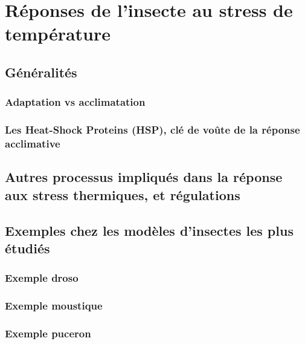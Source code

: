 \chapter{Réponses de l'insecte au stress de température} %
\label{chap:repstress}
	
	\section{Généralités} %
	\label{sec:g_n_ralit_s}
		

		\subsection{Adaptation vs acclimatation} %
		\label{sub:adaptation_vs_accilmatation}
			

%			

		\subsection{Les Heat-Shock Proteins (HSP), clé de voûte de la réponse acclimative} %
		\label{sub:generalites_HSP}
			

	\section{Autres processus impliqués dans la réponse aux stress thermiques, et régulations} %
	\label{sec:rep_misc}
		

	\section{Exemples chez les modèles d'insectes les plus étudiés} %
	\label{sec:exemples_modeles}
		

		\subsection{Exemple droso} %
		\label{sub:exemple_droso}
			

		\subsection{Exemple moustique} %
		\label{sub:exemple_moustique}
			

		\subsection{Exemple puceron} %
		\label{sub:exemple_puceron}
			

